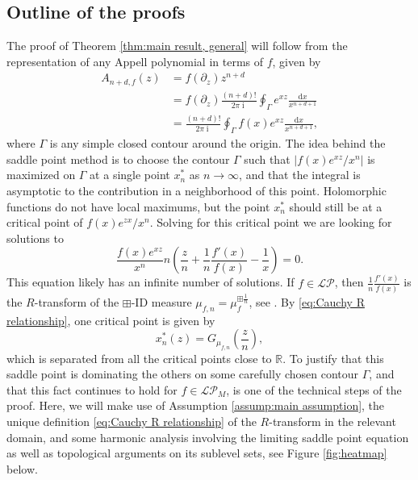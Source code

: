 \documentclass[reqno]{amsart}
\newcommand{\1}{\mathbf{1}}
\newcommand{\dd}{\mathrm{d}}
\DeclareMathOperator{\ii}{i}
\newcommand{\R}{\mathbb{R}}
\def\R{\mathbb{R}}
\newcommand{\LP}{\mathcal{LP}}
\theoremstyle{plain}
\theoremstyle{definition}
\theoremstyle{remark}
\numberwithin{equation}{section}
\begin{document}
 \subsection{Outline of the proofs}\label{sec:outline_of_proof} The proof of Theorem \ref{thm:main result, general} will follow from the representation of any Appell polynomial in terms of $f$, given by \begin{equation}\label{eq:Appell contour}
 	\begin{aligned}
 		A_{n+d,f}(z)&=f(\partial_{z})z^{n+d}\\
 		&=f(\partial_{z})\frac{(n+d)!}{2\pi\ii}\oint_{\Gamma}e^{xz}\frac{\dd x}{x^{n+d+1}}\\
 		&=\frac{(n+d)!}{2\pi\ii}\oint_{\Gamma} f(x)e^{xz}\frac{\dd x}{x^{n+d+1}},
 	\end{aligned} 
 \end{equation} where $\Gamma$ is any simple closed contour around the origin. The idea behind the saddle point method is to choose the contour $\Gamma$ such that $\left|f(x)e^{xz}/x^{n}\right|$ is maximized on $\Gamma$ at a single point $x_n^*$  as $n\rightarrow\infty$, and that the integral is asymptotic to the contribution in a neighborhood of this point. Holomorphic functions do not have local maximums, but the point $x_n^*$ should still be at a critical point of $f(x)e^{zx}/x^{n}$. Solving for this critical point we are looking for solutions to \begin{equation*}
 \frac{f(x)e^{xz}}{x^n}n\left(\frac{z}{n}+\frac{1}{n}\frac{f'(x)}{f(x)}-\frac{1}{x}\right)=0.
 \end{equation*} This equation likely has an infinite number of solutions.  If $f\in\LP$, then   $\frac{1}{n}\frac{f'(x)}{f(x)}$ is the $R$-transform of the $\boxplus$-ID measure $\mu_{f,n}=\mu_{f}^{\boxplus \frac{1} {n}}$, see \cite[\S  2.1]{campbell2025freeinfinitedivisibilityfractional}.  By \eqref{eq:Cauchy R relationship}, one critical point is given by \begin{equation*}
 x_{n}^*(z)=G_{\mu_{f,n}}\left(\frac{z}{n}\right),
 \end{equation*}
 which is separated from all the critical points close to $\R$.
 To justify that this saddle point is dominating the others on some carefully chosen contour $\Gamma$, and that this fact continues to hold for $f\in\LP_M$, is one of the technical steps of the proof. Here, we will make use of Assumption \ref{assump:main assumption}, the unique definition \eqref{eq:Cauchy R relationship} of the $R$-transform in the relevant domain, and some harmonic analysis involving the limiting saddle point equation as well as topological arguments on its sublevel sets, see Figure \ref{fig:heatmap} below. 
 
\end{document}
